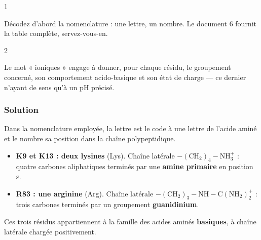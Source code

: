 \documentclass[11pt,a4paper]{article}
\providecommand{\tightlist}{\setlength{\itemsep}{0pt}\setlength{\parskip}{0pt}}
\begin{document}
\begin{indication}{1}

Décodez d'abord la nomenclature : une lettre, un nombre. Le document 6 fournit la table complète, servez-vous-en.

\end{indication}

\begin{indication}{2}

Le mot « ioniques » engage à donner, pour chaque résidu, le groupement concerné, son comportement acido-basique et son état de charge --- ce dernier n'ayant de sens qu'à un pH précisé.

\end{indication}

\hypertarget{solution-12}{%
\subsubsection{Solution}\label{solution-12}}

Dans la nomenclature employée, la lettre est le code à une lettre de l'acide aminé et le nombre sa position dans la chaîne polypeptidique.

\begin{itemize}
\tightlist
\item
  \textbf{K9 et K13 : deux lysines} (Lys). Chaîne latérale \(-(\mathrm{CH_2})_4-\mathrm{NH_3^+}\) : quatre carbones aliphatiques terminés par une \textbf{amine primaire} en position ε.
\item
  \textbf{R83 : une arginine} (Arg). Chaîne latérale \(-(\mathrm{CH_2})_3-\mathrm{NH}-\mathrm{C}(\mathrm{NH_2})_2^+\) : trois carbones terminés par un groupement \textbf{guanidinium}.
\end{itemize}

Ces trois résidus appartiennent à la famille des acides aminés \textbf{basiques}, à chaîne latérale chargée positivement.
\end{document}
